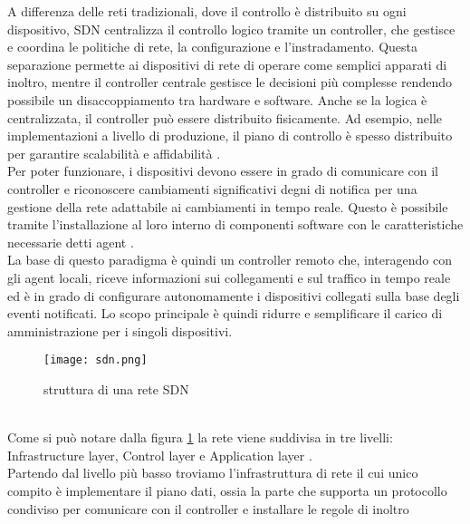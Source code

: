 A differenza delle reti tradizionali, dove il controllo è distribuito su ogni dispositivo, SDN centralizza il controllo logico tramite un controller, che gestisce e coordina le politiche di rete, la configurazione e l'instradamento.
Questa separazione permette ai dispositivi di rete di operare come semplici apparati di inoltro, mentre il controller centrale gestisce le decisioni più complesse rendendo possibile un disaccoppiamento tra hardware e software.
Anche se la logica è centralizzata, il controller può essere distribuito fisicamente. 
Ad esempio, nelle implementazioni a livello di produzione, il piano di controllo è spesso distribuito per garantire scalabilità e affidabilità \cite{sdnlayers}.
\\Per poter funzionare, i dispositivi devono essere in grado di comunicare con il controller e riconoscere cambiamenti significativi degni di notifica per una gestione della rete adattabile ai cambiamenti in tempo reale. 
Questo è possibile tramite l'installazione al loro interno di componenti software con le caratteristiche necessarie
detti agent \cite{tesiSDN:2017}.
\\La base di questo paradigma è quindi un controller remoto che, interagendo con gli agent
locali, riceve informazioni sui collegamenti e sul traffico in tempo reale ed è in grado di
configurare autonomamente i dispositivi collegati sulla base degli eventi notificati. Lo scopo
principale è quindi ridurre e semplificare il carico di amministrazione per i singoli dispositivi.
\begin{figure}[h]
    \centering
   \texttt{[image: sdn.png]}
    \caption{struttura di una rete SDN \cite{fotosdn}}
    \label{fig:sdnF}
\end{figure}
\\Come si può notare dalla figura \ref{fig:sdnF} la rete viene suddivisa in tre livelli: Infrastructure layer, Control layer e Application layer \cite{sdnlayers}.
\\Partendo dal livello più basso troviamo l'infrastruttura di rete il cui unico compito è implementare il piano dati, ossia la parte che supporta un protocollo condiviso per comunicare con il controller e installare le regole di inoltro

